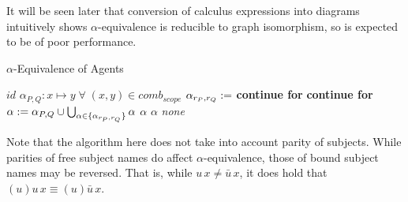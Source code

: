         It will be seen later that conversion of calculus expressions into diagrams intuitively shows $\alpha$-equivalence is reducible to graph isomorphism, so is expected to be of poor performance.
        \begin{breakablealgorithm}
            \caption{$\alpha$-Equivalence of Agents}
            \begin{algorithmic}[1]
                        \State\Return$id$
                    \EndIf
                        \State$\alpha_{P, Q} : x \mapsto y \; \forall \; (x, y) \in comb_{scope}$
                                \State$\alpha_{r_P, r_Q} :=$ 
                            \EndFor
                                \State\textbf{continue for}
                                \State\textbf{continue for}
                            \Else
                                \State$\alpha := \alpha_{P, Q} \cup \bigcup_{\alpha \in \{\alpha_{r_P, r_Q}\}} \alpha$
                            \EndIf
                                \State\Return$\alpha$
                            \EndIf
                        \EndFor
                            \State\Return$\alpha$
                        \EndIf
                    \EndFor
                    \State\Return\textit{none}
                \EndFunction
            \end{algorithmic}
        \end{breakablealgorithm}
        Note that the algorithm here does not take into account parity of subjects.
        While parities of free subject names do affect $\alpha$-equivalence, those of bound subject names may be reversed.
        That is, while $u \, x \neq \bar{u} \, x$, it does hold that $(u)u \, x \equiv (u)\bar{u} \, x$.


